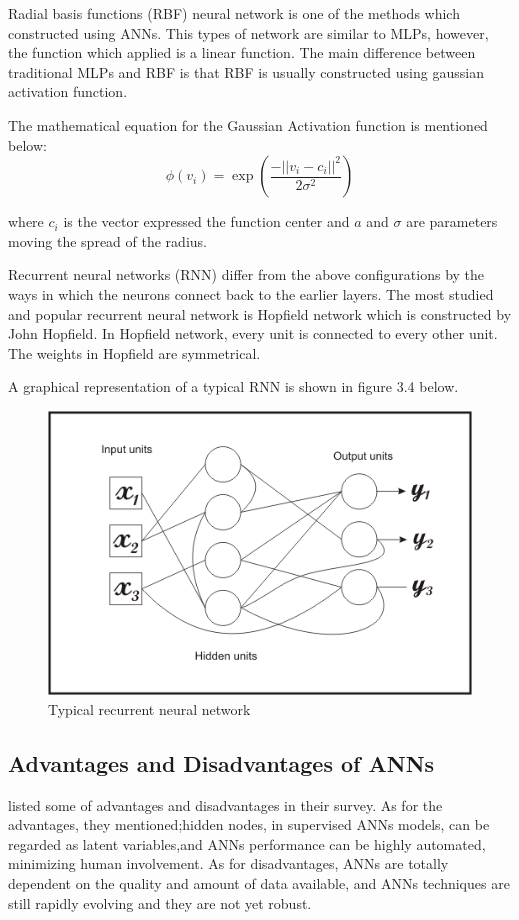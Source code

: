 Radial basis functions (RBF) neural network is one of the methods which constructed using ANNs. This types of network are similar to MLPs, however, the function which  applied is a linear function. The main difference between traditional MLPs and RBF is that RBF is usually constructed using gaussian activation function. 

The mathematical equation for the Gaussian Activation function is mentioned below:
\begin{equation*}
	\phi(v_i) = \exp(\frac{-|| v_i - c_i ||^2}{2 \sigma^2})
\end{equation*}

where $c_i$ is the vector expressed the function center and $a$ and $\sigma$ are parameters moving the spread of the radius.

Recurrent neural networks (RNN) differ from the above configurations by the ways in which the neurons connect back to the earlier layers. The most studied and popular recurrent neural network is Hopfield network which is constructed by John Hopfield. In Hopfield network, every unit is connected to every other unit. The weights in Hopfield are symmetrical.

A graphical representation of a typical RNN is shown in figure 3.4 below.
\begin{figure}[hbt!]\centering
	\includegraphics[width=.5\textwidth]{rnn}
	\caption{Typical recurrent neural network}
\end{figure}

\pagebreak
\subsection{Advantages and Disadvantages of ANNs}

 listed some of advantages and disadvantages in their survey. As for the advantages, they mentioned;hidden nodes, in supervised ANNs models, can be regarded as latent variables,and ANNs performance can be highly automated, minimizing human involvement. As for disadvantages, ANNs are totally dependent on the quality and amount of data available, and ANNs techniques are still rapidly evolving and they are not yet robust.

